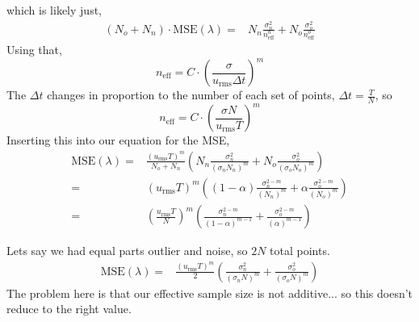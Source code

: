 \documentclass[11pt]{article}
\begin{document}
    which is likely just,
    \begin{align}
    (N_o + N_n) \cdot  \textrm{MSE}(\lambda) =& N_n \frac{\sigma_n^2}{n^n_\textrm{eff}} + N_o \frac{\sigma_o^2}{n^o_\textrm{eff}}
    \end{align}
Using that,
\begin{equation}
n_{\textrm{eff}} = C \cdot \left(\frac{\sigma}{u_{\textrm{rms}}\Delta t}\right)^m
\end{equation}
The $\Delta t$ changes in proportion to the number of each set of points, $\Delta t = \frac{T}{N}$, so
\begin{equation}
n_{\textrm{eff}} = C \cdot \left(\frac{\sigma N}{u_{\textrm{rms}}T}\right)^m
\end{equation}
Inserting this into our equation for the MSE,
    \begin{align}
 \textrm{MSE}(\lambda) =&\frac{ \left(u_{\textrm{rms}}T\right)^m}{N_o + N_n} \left( N_n \frac{\sigma_n^2}{ \left( \sigma_n N_n \right)^m } + N_o \frac{\sigma_o^2}{ \left( \sigma_o N_o \right)^m} \right) \\
 =& \left(u_{\textrm{rms}}T\right)^m\left( (1-\alpha) \frac{\sigma_n^{2-m}}{  (N_n)^m } + \alpha \frac{\sigma_o^{2-m}}{  (N_o)^m} \right) \\
  =& \left(\frac{u_{\textrm{rms}}T}{N}\right)^m\left( \frac{\sigma_n^{2-m}}{  (1-\alpha)^{m-1} } + \frac{\sigma_o^{2-m}}{  (\alpha)^{m-1}} \right)
    \end{align}
    
    Lets say we had equal parts outlier and noise, so $2N$ total points.
        \begin{align}
 \textrm{MSE}(\lambda) =&\frac{ \left(u_{\textrm{rms}}T\right)^m}{2} \left(  \frac{\sigma_n^2}{ \left( \sigma_n N \right)^m } +  \frac{\sigma_o^2}{ \left( \sigma_o N \right)^m} \right)
    \end{align}
    The problem here is that our effective sample size is not additive... so this doesn't reduce to the right value.
   
\end{document}
